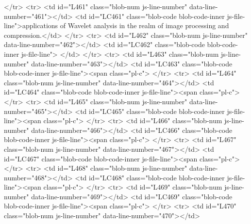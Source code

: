       </tr>
      <tr>
        <td id="L461" class="blob-num js-line-number" data-line-number="461"></td>
        <td id="LC461" class="blob-code blob-code-inner js-file-line">applications of Wavelet analysis in the realm of image processing and compression.</td>
      </tr>
      <tr>
        <td id="L462" class="blob-num js-line-number" data-line-number="462"></td>
        <td id="LC462" class="blob-code blob-code-inner js-file-line">
</td>
      </tr>
      <tr>
        <td id="L463" class="blob-num js-line-number" data-line-number="463"></td>
        <td id="LC463" class="blob-code blob-code-inner js-file-line"><span class="pl-c">%
      </tr>
      <tr>
        <td id="L464" class="blob-num js-line-number" data-line-number="464"></td>
        <td id="LC464" class="blob-code blob-code-inner js-file-line"><span class="pl-c">%
      </tr>
      <tr>
        <td id="L465" class="blob-num js-line-number" data-line-number="465"></td>
        <td id="LC465" class="blob-code blob-code-inner js-file-line"><span class="pl-c">%
      </tr>
      <tr>
        <td id="L466" class="blob-num js-line-number" data-line-number="466"></td>
        <td id="LC466" class="blob-code blob-code-inner js-file-line"><span class="pl-c">%
      </tr>
      <tr>
        <td id="L467" class="blob-num js-line-number" data-line-number="467"></td>
        <td id="LC467" class="blob-code blob-code-inner js-file-line"><span class="pl-c">%
      </tr>
      <tr>
        <td id="L468" class="blob-num js-line-number" data-line-number="468"></td>
        <td id="LC468" class="blob-code blob-code-inner js-file-line"><span class="pl-c">%
      </tr>
      <tr>
        <td id="L469" class="blob-num js-line-number" data-line-number="469"></td>
        <td id="LC469" class="blob-code blob-code-inner js-file-line"><span class="pl-c">%
      </tr>
      <tr>
        <td id="L470" class="blob-num js-line-number" data-line-number="470"></td>
